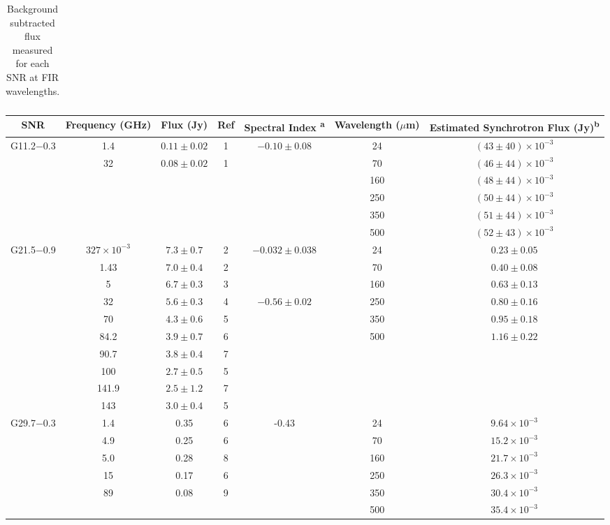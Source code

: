 \documentclass[fleqn,usenatbib]{mnras}
\begin{document}
{\begin{table}
\begin{tabular}{c c c c}
	\end{tabular}
	\caption{Background subtracted flux measured for each SNR at FIR wavelengths.}
	\label{tab:FIRFlux}
\end{table}

\begin{table*}
	\begin{tabular}{c c c c c c c}\\
	\hline
	SNR & Frequency (GHz) & Flux (Jy) & Ref & Spectral Index \textsuperscript{a} & Wavelength ($\mu$m) & Estimated Synchrotron Flux (Jy)\textsuperscript{b} \\\hline\hline
	G11.2$-$0.3 & 1.4 & $0.11 \pm 0.02$ & 1 & $-0.10 \pm 0.08$ & 24 & $(43 \pm 40) \times 10^{-3}$ \\
	& 32 & $0.08 \pm 0.02$ & 1 & & 70 & $(46 \pm 44) \times 10^{-3}$ \\
	& & & & & 160 & $(48 \pm 44) \times 10^{-3}$ \\
	& & & & & 250 & $(50 \pm 44) \times 10^{-3}$ \\
	& & & & & 350 & $(51 \pm 44) \times 10^{-3}$ \\
	& & & & & 500 & $(52 \pm 43) \times 10^{-3}$ \\ \hline

	G21.5$-$0.9 & $327 \times 10^{-3}$ & $7.3 \pm 0.7$ & 2 & $-0.032 \pm 0.038$ & 24 & $0.23 \pm 0.05$\\
	& 1.43 & $7.0 \pm 0.4$ & 2 & & 70 & $0.40 \pm 0.08$ \\
	& 5   & $6.7 \pm 0.3$ & 3 & & 160 & $0.63 \pm 0.13$ \\
	& 32  & $5.6 \pm 0.3$ & 4 & $-0.56 \pm 0.02$ & 250 & $0.80 \pm 0.16$ \\
	& 70  & $4.3 \pm 0.6$ & 5 & & 350 & $0.95 \pm 0.18$ \\
	& 84.2 & $3.9 \pm 0.7$ & 6 & & 500 & $1.16 \pm 0.22$ \\
	& 90.7 & $3.8 \pm 0.4$ & 7 & & & \\
	& 100 & $2.7 \pm 0.5$ & 5 & & & \\
	& 141.9 & $2.5 \pm 1.2$ & 7 & & & \\
	& 143 & $3.0 \pm 0.4$ & 5 & \\ \hline

	G29.7$-$0.3 & 1.4 & 0.35 & 6 & -0.43 & 24 & $9.64 \times 10^{-3}$ \\
	& 4.9 & 0.25 & 6 & & 70 & $15.2 \times 10^{-3}$ \\
	& 5.0 & 0.28 & 8 & & 160 & $21.7 \times 10^{-3}$ \\
	& 15 & 0.17 & 6 & & 250 & $26.3 \times 10^{-3}$ \\
	& 89 & 0.08 & 9 & & 350 & $30.4 \times 10^{-3}$ \\
	& & & & & 500 & $35.4 \times 10^{-3}$ \\ \hline


\end{tabular}
\end{table*}}
\end{document}
